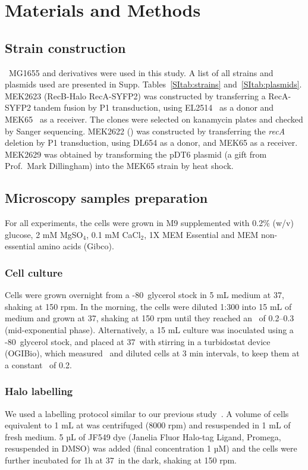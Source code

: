 \section*{Materials and Methods}

\subsection*{Strain construction}
\ecoli\ MG1655 and derivatives were used in this study. A list of all strains and plasmids used are presented in Supp. Tables~\ref{SItab:strains} and~\ref{SItab:plasmids}.
MEK2623 (RecB-Halo RecA-SYFP2) was constructed by transferring a RecA-SYFP2 tandem fusion by P1 transduction, using EL2514~\cite{Wiktor2021} as a donor and MEK65~\cite{Lepore2019a} as a receiver. The clones were selected on kanamycin plates and checked by Sanger sequencing. MEK2622 (\dreca) was constructed by transferring the \emph{recA} deletion by P1 transduction, using DL654 as a donor, and MEK65 as a receiver. MEK2629 was obtained by transforming the pDT6 plasmid (a gift from Prof.\ Mark Dillingham) into the MEK65 strain by heat shock.

\subsection*{Microscopy samples preparation}
For all experiments, the cells were grown in M9 supplemented with 0.2\% (w/v) glucose, 2 mM MgSO$_4$, 0.1 mM CaCl$_2$, 1X MEM Essential and MEM non-essential amino acids (Gibco).
\subsubsection*{Cell culture}
Cells were grown overnight from a -80\celsius\ glycerol stock in 5 mL medium at 37\celsius, shaking at 150 rpm. In the morning, the cells were diluted 1:300 into 15 mL of medium and grown at 37\celsius, shaking at 150 rpm until they reached an \od\ of 0.2--0.3 (mid-exponential phase).
Alternatively, a 15 mL culture was inoculated using a -80\celsius\ glycerol stock, and placed at 37\celsius\ with stirring in a turbidostat device (OGIBio), which measured \od\ and diluted cells at 3 min intervals, to keep them at a constant \od\ of 0.2.
\subsubsection*{Halo labelling}
We used a labelling protocol similar to our previous study~\cite{Lepore2025}. A volume of cells equivalent to 1 mL at  was centrifuged (8000 rpm) and resuspended in 1 mL of fresh medium. 5 µL of JF549 dye (Janelia Fluor Halo-tag Ligand, Promega, resuspended in DMSO) was added (final concentration 1 µM) and the cells were further incubated for 1h at 37\celsius\ in the dark, shaking at 150 rpm.
